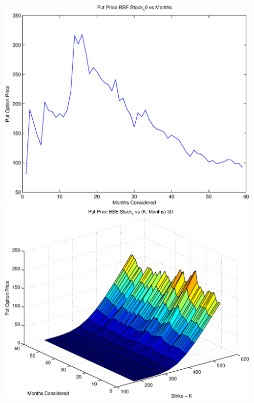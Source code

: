 \documentclass{article}
\begin{document}
\includegraphics[width=\textwidth]{Put_Price_BSE_Stock_10_vs_Months} \\

\includegraphics[width=\textwidth]{Put_Price_BSE_Stock_1_vs_(K,_Months)_3D} \\
\end{document}
